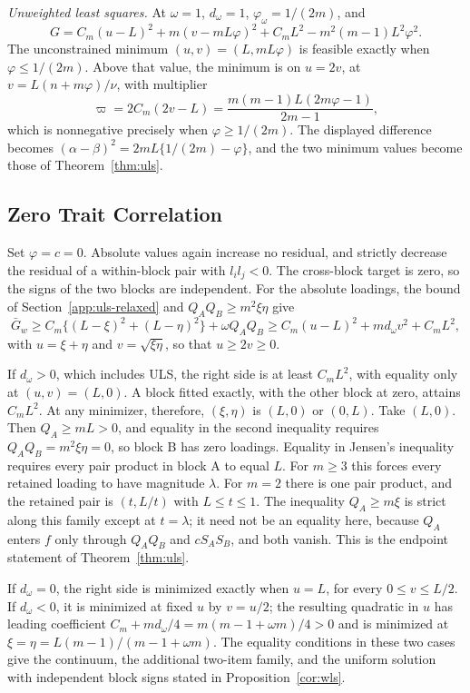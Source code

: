 \emph{Unweighted least squares.} At $\omega=1$, $d_\omega=1$, $\varphi_\omega=1/(2m)$, and
\[
G=C_m(u-L)^2+m(v-mL\varphi)^2
+C_mL^2-m^2(m-1)L^2\varphi^2 .
\]
The unconstrained minimum $(u,v)=(L,mL\varphi)$ is feasible exactly when $\varphi\le1/(2m)$. Above that value, the minimum is on $u=2v$, at $v=L(n+m\varphi)/\nu $, with multiplier
\[
\varpi=2C_m(2v-L)
=\frac{m(m-1)L(2m\varphi-1)}{2m-1},
\]
which is nonnegative precisely when $\varphi\ge1/(2m)$. The displayed difference becomes $(\alpha-\beta)^2=2mL\{1/(2m)-\varphi\}$, and the two minimum values become those of Theorem~\ref{thm:uls}.

\subsection{Zero Trait Correlation}
\label{app:uls-zero}

Set $\varphi=c=0$. Absolute values again increase no residual, and strictly decrease the residual of a within-block pair with $l_il_j<0$. The cross-block target is zero, so the signs of the two blocks are independent. For the absolute loadings, the bound of Section~\ref{app:uls-relaxed} and $Q_AQ_B\ge m^2\xi\eta$ give
\[
\bar G_w\ge C_m\{(L-\xi)^2+(L-\eta)^2\}+\omega Q_AQ_B
\ge C_m(u-L)^2+md_\omega v^2+C_mL^2,
\]
with $u=\xi+\eta$ and $v=\sqrt{\xi\eta}$, so that $u\ge2v\ge0$.

If $d_\omega>0$, which includes ULS, the right side is at least $C_mL^2$, with equality only at $(u,v)=(L,0)$. A block fitted exactly, with the other block at zero, attains $C_mL^2$. At any minimizer, therefore, $(\xi,\eta)$ is $(L,0)$ or $(0,L)$. Take $(L,0)$. Then $Q_A\ge mL>0$, and equality in the second inequality requires $Q_AQ_B=m^2\xi\eta=0$, so block B has zero loadings. Equality in Jensen's inequality requires every pair product in block A to equal $L$. For $m\ge3$ this forces every retained loading to have magnitude $\lambda$. For $m=2$ there is one pair product, and the retained pair is $(t,L/t)$ with $L\le t\le1$. The inequality $Q_A\ge m\xi$ is strict along this family except at $t=\lambda$; it need not be an equality here, because $Q_A$ enters $f$ only through $Q_AQ_B$ and $cS_AS_B$, and both vanish. This is the endpoint statement of Theorem~\ref{thm:uls}.

If $d_\omega=0$, the right side is minimized exactly when $u=L$, for every $0\le v\le L/2$. If $d_\omega<0$, it is minimized at fixed $u$ by $v=u/2$; the resulting quadratic in $u$ has leading coefficient $C_m+md_\omega/4=m(m-1+\omega m)/4>0$ and is minimized at $\xi=\eta=L(m-1)/(m-1+\omega m)$. The equality conditions in these two cases give the continuum, the additional two-item family, and the uniform solution with independent block signs stated in Proposition~\ref{cor:wls}.

